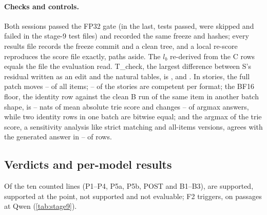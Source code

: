 \paragraph{Checks and controls.} Both sessions passed the FP32 gate (in the last, \NqTestsPassed{} tests passed, \NqTestsSkipped{} were skipped and \NqTestsFailed{} failed in the \NqTestFiles{} stage-9 test files) and recorded the same freeze and hashes; every results file records the freeze commit and a clean tree, and a local re-score reproduces the score file exactly, paths aside. The $l_b$ re-derived from the C rows equals the file the evaluation read. T\_check, the largest difference between S's residual written as an edit and the natural tables, is \NqTcheckMistralSeven{}, \NqTcheckLlamaEight{} and \NqTcheckQwenSeven{}. In stories, the full patch moves \NqFullMin{}--\NqFullMax{} of all items; \NqCompetentMin{}--\NqCompetentMax{} of the stories are competent per format; the BF16 floor, the identity row against the clean B run of the same item in another batch shape, is \NqFloorMin{}--\NqFloorMax{} nats of mean absolute trie score and changes \NqFloorArgMin{}--\NqFloorArgMax{} of argmax answers, while two identity rows in one batch are bitwise equal; and the argmax of the trie score, a sensitivity analysis like strict matching and all-items versions, agrees with the generated answer in \NqEargGenMin{}--\NqEargGenMax{} of rows.

\subsection{Verdicts and per-model results}\label{app:s9-results}

Of the ten counted lines (P1--P4, P5a, P5b, POST and B1--B3), \NqTotSupported{} are supported, \NqTotAtPoint{} supported at the point, \NqTotNotSupported{} not supported and \NqTotNotEvaluable{} not evaluable; F2 triggers, on passages at Qwen (\cref{tab:stage9}).


